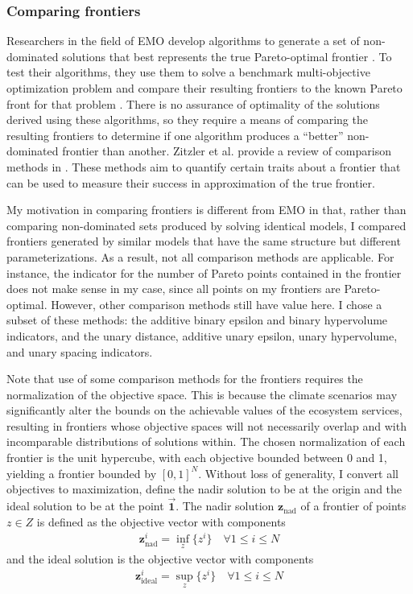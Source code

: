 \subsubsection{Comparing frontiers}
Researchers in the field of EMO develop algorithms to generate a set of non-dominated solutions that best represents the true Pareto-optimal frontier \cite{deb2001multi}. To test their algorithms, they use them to solve a benchmark multi-objective optimization problem and compare their resulting frontiers to the known Pareto front for that problem \cite{knowles2002metrics}. There is no assurance of optimality of the solutions derived using these algorithms, so they require a means of comparing the resulting frontiers to determine if one algorithm produces a ``better'' non-dominated frontier than another. Zitzler et al. provide a review of comparison methods in \cite{zitzler2003performance}. These methods aim to quantify certain traits about a frontier that can be used to measure their success in approximation of the true frontier.

My motivation in comparing frontiers is different from EMO in that, rather than comparing non-dominated sets produced by solving identical models, I compared frontiers generated by similar models that have the same structure but different parameterizations. As a result, not all comparison methods are applicable. For instance, the indicator for the number of Pareto points contained in the frontier does not make sense in my case, since all points on my frontiers are Pareto-optimal. However, other comparison methods still have value here. I chose a subset of these methods: the additive binary epsilon and binary hypervolume indicators, and the unary distance, additive unary epsilon, unary hypervolume, and unary spacing indicators.

Note that use of some comparison methods for the frontiers requires the normalization of the objective space. This is because the climate scenarios may significantly alter the bounds on the achievable values of the ecosystem services, resulting in frontiers whose objective spaces will not necessarily overlap and with incomparable distributions of solutions within. The chosen normalization of each frontier is the unit hypercube, with each objective bounded between 0 and 1, yielding a frontier bounded by $[0,1]^N$. Without loss of generality, I convert all objectives to maximization, define the nadir solution to be at the origin and the ideal solution to be at the point $\vec{\mathbf{1}}$. The nadir solution $\mathbf{z}_{\text{nad}}$ of a frontier of points $z \in Z$ is defined as the objective vector with components
\begin{align}
\mathbf{z}_{\text{nad}}^i = \inf_{z} \{ z^i \} \quad \forall 1 \le i \le N
\end{align}
and the ideal solution is the objective vector with components
\begin{align}
\mathbf{z}_{\text{ideal}}^i = \sup_{z} \{ z^i \} \quad \forall 1 \le i \le N
\end{align}

